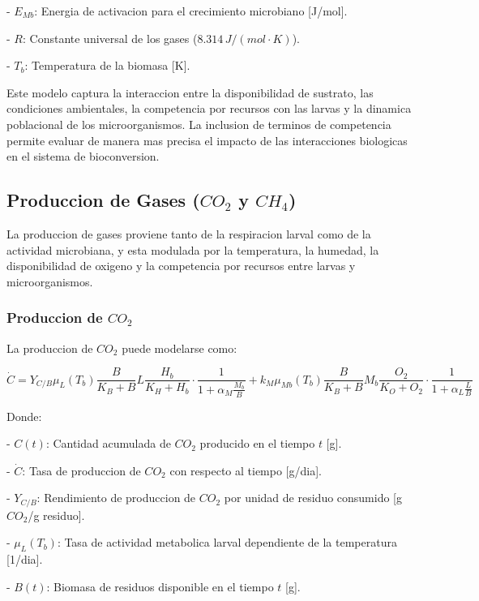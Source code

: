 - $E_{Mb}$: Energia de activacion para el crecimiento microbiano [J/mol].

- $R$: Constante universal de los gases ($8.314\, J/(mol \cdot K)$).

- $T_b$: Temperatura de la biomasa [K].


\vspace{1cm}
Este modelo captura la interaccion entre la disponibilidad de sustrato, las condiciones ambientales, la competencia por recursos con las larvas y la dinamica poblacional de los microorganismos. La inclusion de terminos de competencia permite evaluar de manera mas precisa el impacto de las interacciones biologicas en el sistema de bioconversion.

\subsection{Produccion de Gases ($CO_2$ y $CH_4$)}

La produccion de gases proviene tanto de la respiracion larval como de la actividad microbiana, y esta modulada por la temperatura, la humedad, la disponibilidad de oxigeno y la competencia por recursos entre larvas y microorganismos.

\vspace{1cm}
\subsubsection{Produccion de $CO_2$}

La produccion de $CO_2$ puede modelarse como:

\begin{equation}
\dot{C} = Y_{C/B} \mu_L(T_b) \frac{B}{K_B + B} L \frac{H_b}{K_H + H_b} \cdot \frac{1}{1 + \alpha_M \frac{M_b}{B}} + k_M \mu_{Mb}(T_b) \frac{B}{K_B + B} M_b \frac{O_2}{K_O + O_2} \cdot \frac{1}{1 + \alpha_L \frac{L}{B}}
\end{equation}

Donde:

- $C(t)$: Cantidad acumulada de $CO_2$ producido en el tiempo $t$ [g].

- $\dot{C}$: Tasa de produccion de $CO_2$ con respecto al tiempo [g/dia].

- $Y_{C/B}$: Rendimiento de produccion de $CO_2$ por unidad de residuo consumido [g $CO_2$/g residuo].

- $\mu_L(T_b)$: Tasa de actividad metabolica larval dependiente de la temperatura [1/dia].

- $B(t)$: Biomasa de residuos disponible en el tiempo $t$ [g].

